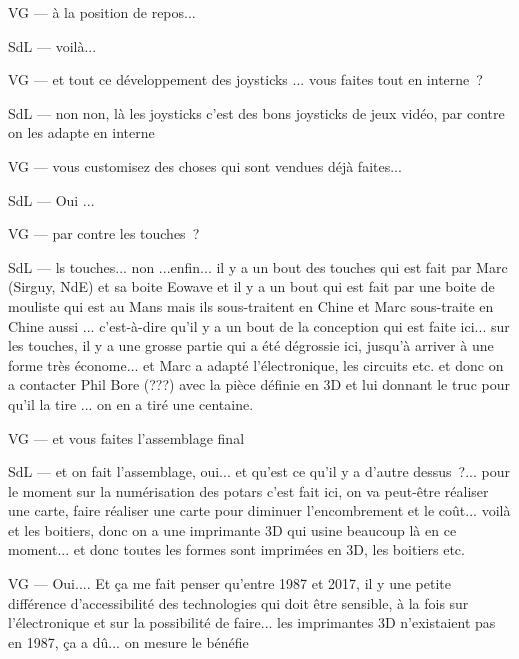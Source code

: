 VG — à la position de repos... 

SdL — voilà... 

VG — et tout ce développement des joysticks ... vous faites tout en interne ? 

SdL — non non, là les joysticks c'est des bons joysticks de jeux vidéo, par contre on les adapte en interne 

VG — vous customisez des choses qui sont vendues déjà faites... 

SdL — Oui ... 

VG — par contre les touches ? 

SdL — ls touches... non ...enfin... il y a un bout des touches qui est fait par Marc (Sirguy, NdE) et sa boite Eowave et il y a un bout qui est fait par une boite de mouliste qui est au Mans mais ils sous-traitent en Chine et Marc sous-traite en Chine aussi ... c'est-à-dire qu'il y a un bout de la conception qui est faite ici... sur les touches, il y a une grosse partie qui a été dégrossie ici, jusqu'à arriver à une forme très économe... et Marc a adapté l'électronique, les circuits etc. et donc on a contacter Phil Bore (???) avec la pièce définie en 3D et lui donnant le truc pour qu'il la tire ... on en a tiré une centaine. 

VG — et vous faites l'assemblage final 

SdL — et on fait l'assemblage, oui... et qu'est ce qu'il y a d'autre dessus ?... pour le moment sur la numérisation des potars c'est fait ici, on va peut-être réaliser une carte, faire réaliser une carte pour diminuer l'encombrement et le coût... voilà et les boitiers, donc on a une imprimante 3D qui usine beaucoup là en ce moment... et donc toutes les formes sont imprimées en 3D, les boitiers etc. 

VG — Oui.... Et ça me fait penser qu'entre 1987 et 2017, il y une petite différence d'accessibilité des technologies qui doit être sensible, à la fois sur l'électronique et sur la possibilité de faire... les imprimantes 3D n'existaient pas en 1987, ça a dû... on mesure le bénéfie 

